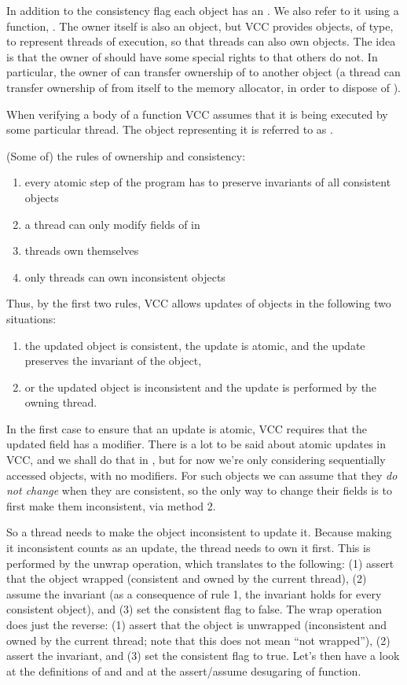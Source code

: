 In addition to the consistency flag each object has an .
We also refer to it using a function, .
The owner itself is also an object, but VCC provides objects, of \vcc{\thread}
type, to represent threads of execution, so that threads can also own objects.
The idea is that the owner of  should have some special rights to  that others do not.
In particular, the owner of  can transfer ownership of  to
another object (\eg a thread can transfer ownership of  from itself to the memory allocator, 
in order to dispose of ).

When verifying a body of a function VCC assumes that it is being executed by some
particular thread.
The \vcc{\thread} object representing it is referred to as \vcc{\me}.

(Some of) the rules of ownership and consistency:
\begin{enumerate}
\item every atomic step of the program has to preserve invariants of all consistent objects 
\item a thread can only modify fields of in
\item threads own themselves
\item only threads can own inconsistent objects
\end{enumerate}
Thus, by the first two rules, VCC allows updates of objects in the following two situations:
\begin{enumerate}
\item the updated object is consistent, the update is atomic, and the update preserves the invariant of the object,
\item or the updated object is inconsistent and the update is performed by the owning thread.
\end{enumerate}
In the first case to ensure that an update is atomic, VCC requires that the
updated field has a  modifier.
There is a lot to be said about atomic updates in VCC, and we shall do
that in , but for now we're only considering sequentially
accessed objects, with no  modifiers.
For such objects we can assume that they \emph{do not change}
when they are consistent, so the only way to change their fields is to
first make them inconsistent, \ie via method 2.

So a thread needs to make the object inconsistent to update it.
Because making it inconsistent counts as an update, the thread needs
to own it first.
This is performed by the unwrap operation, which translates to the following:
(1) assert that the object wrapped (consistent and owned by the current thread), 
(2) assume the invariant (as a consequence of rule 1, the invariant holds for every consistent object),
and (3) set the consistent flag to false.
The wrap operation does just the reverse:
(1) assert that the object is unwrapped (inconsistent and owned by the current thread;
note that this does not mean ``not wrapped''),
(2) assert the invariant, 
and (3) set the consistent flag to true.
Let's then have a look at the definitions of  and %
and at the assert/assume desugaring of  function.

